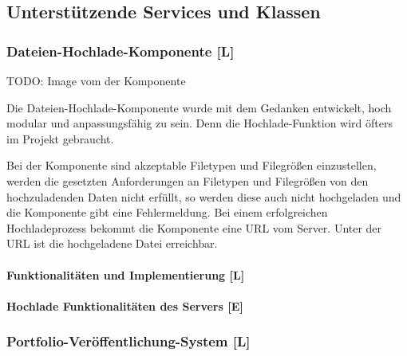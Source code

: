 \subsection{Unterstützende Services und Klassen}
\label{sec::impl::contentcreation::UnterstuetzendeServicesUndKlassen}
\subsubsection{Dateien-Hochlade-Komponente [L]}
\label{sec:impl:contentcreation:file-Upload}

TODO: Image vom der Komponente

Die Dateien-Hochlade-Komponente wurde mit dem Gedanken entwickelt, hoch modular und anpassungsfähig zu sein. Denn die Hochlade-Funktion wird öfters im Projekt gebraucht.

Bei der Komponente sind akzeptable Filetypen und Filegrößen einzustellen, werden die gesetzten Anforderungen an Filetypen und Filegrößen von den hochzuladenden Daten nicht erfüllt, so werden diese auch nicht hochgeladen und die Komponente gibt eine Fehlermeldung.
Bei einem erfolgreichen Hochladeprozess bekommt die Komponente eine URL vom Server. Unter der URL ist die hochgeladene Datei erreichbar.

\paragraph{Funktionalitäten und Implementierung [L]}
\paragraph{Hochlade Funktionalitäten des Servers [E]}


\subsubsection{Portfolio-Veröffentlichung-System [L]}